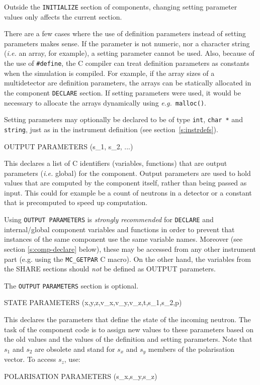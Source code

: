 Outside the \verb+INITIALIZE+ section of components, changing setting parameter
values only affects the current section.

There are a few cases where the use of definition parameters instead of
setting parameters makes sense. If the parameter is not numeric, nor a character string ({\em i.e.} an
array, for example), a setting parameter cannot be
used. Also, because of the use of \verb+#define+, the C compiler can
treat definition parameters as constants when the simulation is
compiled. For example, if the array sizes of a multidetector are
definition parameters, the arrays can be statically allocated in the
component \verb+DECLARE+ section. If setting parameters were used, it
would be necessary to allocate the arrays dynamically using {\em e.g.}\
\verb+malloc()+.

Setting parameters may optionally be declared to be of type \verb+int+,
\verb+char *+ and \verb+string+, just as in the instrument definition (see
section~\ref{s:instrdefs}).

\begin{mcstas}
OUTPUT PARAMETERS (s_1, s_2, ...)
\end{mcstas}

This declares a list of C identifiers (variables, functions) that are
output parameters ({\it i.e.} global) for the
component. Output parameters are used to hold values that are computed
by the component itself, rather than being passed as input. This could
for example be a count of neutrons in a detector or a constant that is
precomputed to speed up computation.

Using \texttt{OUTPUT PARAMETERS} is \emph{strongly recommended} for
\texttt{DECLARE} and internal/global component variables and functions in order
to prevent that instances of the same component use the same variable
names. Moreover (see section \ref{s:comp-declare} below), these may be accessed
from any other instrument part (e.g. using the \verb+MC_GETPAR+ C macro).  On
the other hand, the variables from the SHARE sections should \emph{not} be
defined as OUTPUT parameters.

The \texttt{OUTPUT} \texttt{PARAMETERS} section is optional.

\begin{mcstas}
STATE PARAMETERS (x,y,z,v_x,v_y,v_z,t,s_1,s_2,p)
\end{mcstas}

This declares the parameters that define the state of the incoming
neutron. The task of the component code is to assign new values to these
parameters based on the old values and the values of the definition and
setting parameters. Note that $s_1$ and $s_2$ are obsolete and stand for
$s_x$ and $s_y$ members of the polarisation vector. To access $s_z$, use:
\begin{mcstas}
POLARISATION PARAMETERS (s_x,s_y,s_z)
\end{mcstas}

